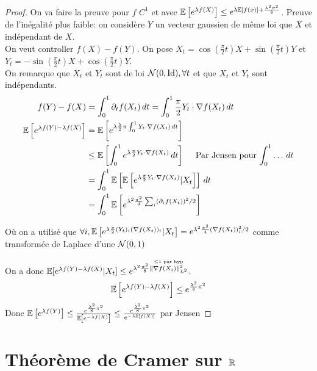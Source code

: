 \documentclass[]{report}
\begin{document}
    \begin{proof}
        On va faire la preuve pour $f$ $C^1$ et avec $\mathbb{E}\left[e^{\lambda f(X)}\right]\le e^{\lambda \mathbb{E}[f(x)] +\frac{\lambda^2\pi^2}{8}}$. Preuve de l'inégalité plus faible: on considère $Y$ un vecteur gaussien de même loi que $X$ et indépendant de $X$.\\
        On veut controller $f(X)-f(Y)$. On pose $X_t=\cos\left(\frac{\pi}{2}t\right)X +\sin\left(\frac{\pi}{2}t\right)Y$ et $Y_t=-\sin\left(\frac{\pi}{2}t\right)X +\cos\left(\frac{\pi}{2}t\right)Y$.\\
        On remarque que $X_t$ et $Y_t$ sont de loi $\mathcal{N}(0,\text{Id}),\forall t$ et que $X_t$ et $Y_t$ sont indépendants.
        \begin{align*}
            f(Y)-f(X)&= \int_{0}^{1} \partial_t f(X_t)\, dt=\int_{0}^{1}\frac{\pi}{2} Y_t \cdot \nabla f(X_t)\, dt\\
            \mathbb{E}\left[e^{\lambda f(Y)-\lambda f(X)}\right]&= \mathbb{E}\left[e^{\lambda\frac{\lambda}{2}\pi \int_{0}^{1} Y_t\cdot \nabla f(X_t)\, dt}\right]\\
            &\le \mathbb{E}\left[ \int_{0}^{1} e^{\lambda \frac{\pi}{2}Y_t \cdot \nabla f(X_t)}\, dt\right]\quad \text{ Par Jensen pour $\int_{0}^{1}\ldots \, dt$}\\
            &= \int_{0}^{1}\mathbb{E}\left[\mathbb{E}\left[ e^{\lambda \frac{\pi}{2}Y_t \cdot \nabla f(X_t)}|X_t\right]\right]\, dt\\
            &=\int_{0}^{1}\mathbb{E}\left[e^{\lambda^2 \frac{\pi^2}{4}\sum_i \left(\partial_i f(X_t)\right)^2 /2}\right]
        \end{align*}
        \begin{center}
            Où on a utilisé que $\forall i, \mathbb{E}\left[e^{\lambda\frac{\pi}{2} (Y_t)_i(\nabla f(X_t))_i}|X_t\right]=e^{\lambda^2 \frac{\pi^2}{4}(\nabla f(X_t))_i^2/2}$ comme transformée de Laplace d'une $\mathcal{N}(0,1)$
        \end{center}
        On a donc $\mathbb{E}[e^{\lambda f(Y)-\lambda f(X)}|X_t]\le e^{\lambda^2\frac{\pi^2}{8}\overset{\le 1\text{ par hyp}}{\lVert \nabla f(X_i) \rVert^2_{L^2}}}$.
        \[\mathbb{E}\left[e^{\lambda f(Y)-\lambda f(X)}\right]\le e^{\frac{\lambda^2}{8}\pi^2}\]
        Donc $\mathbb{E}\left[e^{\lambda f(Y)}\right]\le \frac{e^{\frac{\lambda^2}{ 8}\pi^2}}{\mathbb{E}\left[e^{-\lambda f(X)}\right]}\le \frac{e^{\frac{\lambda^2}{8}\pi^2}}{e^{-\lambda \mathbb{E}\left[ f(X)\right]}}$ par Jensen
    \end{proof}

    \section{Théorème de Cramer sur $\mathbb{R}$}
\end{document}
